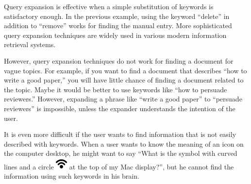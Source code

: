 \documentclass[manuscript,anonymous,review]{acmart}
\begin{document}
Query expansion is effective when a simple substitution of keywords is satisfactory enough.
In the previous example, using the keyword ``delete'' in addition to ``remove'' works
for finding the manual entry.
More sophisticated query expansion techniques are widely used in various modern
information retrieval systems.

However, query expansion techniques do not work for finding a document for vague topics.
For example, if you want to find a document that describes ``how to write a good paper,''
you will have little chance of finding a document related to the topic.
Maybe it would be better to use keywords like ``how to persuade reviewers.''
However, expanding a phrase like ``write a good paper'' to ``persuade reviewers'' is impossible,
unless the expander understands the intention of the user.





It is even more difficult if the user wants to find information that is not easily described with keywords.
When a user wants to know the meaning of an icon on the computer desktop, he might want to say
``What is the symbol with curved lines and a circle
\includegraphics[width=6mm,bb=-40 30 225 225]{figures/fb2349ca17df1876178857566e7c68ef.png} %
at the top of my Mac display?'',
but he cannot find the information using such keywords in his brain.
\end{document}
